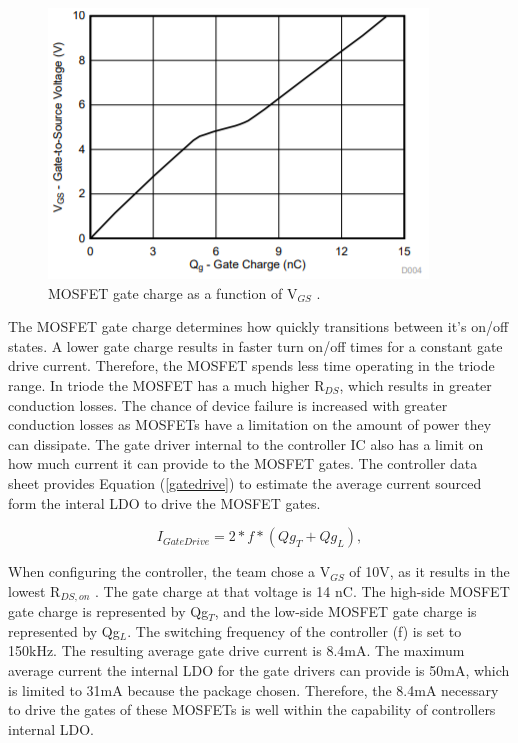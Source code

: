 \documentclass[11pt]{article}
\begin{document}
    \begin{figure}[H]
            \centering
            \includegraphics[width=0.5\linewidth]{mosfetgatecharge.PNG}
            \caption{MOSFET gate charge as a function of V$_{GS}$ \cite{shen_yaur_chen_block_2016}.}
            \label{mosfetgate}
    \end{figure}
    
    The MOSFET gate charge determines how quickly transitions between it's on/off states. A lower gate charge results in faster turn on/off times for a constant gate drive current. Therefore, the MOSFET spends less time operating in the triode range. In triode the MOSFET has a much higher R$_{DS}$, which results in greater conduction losses. The chance of device failure is increased with greater conduction losses as MOSFETs have a limitation on the amount of power they can dissipate.
    \newline
    \newline
    \noindent The gate driver internal to the controller IC also has a limit on how much current it can provide to the MOSFET gates. The controller data sheet provides Equation (\ref{gatedrive}) to estimate the average current sourced form the interal LDO to drive the MOSFET gates. 
    
    \begin{equation}
        I_{GateDrive}=2*f*(Qg_T+Qg_L),
        \label{gatedrive}
    \end{equation}
    
    \noindent When configuring the controller, the team chose a V$_{GS}$ of 10V, as it results in the lowest R$_{DS,on}$ \cite{shen_yaur_chen_block_2016}. The gate charge at that voltage is 14 nC. The high-side MOSFET gate charge is represented by Qg$_T$, and the low-side MOSFET gate charge is represented by Qg$_L$. The switching frequency of the controller (f) is set to 150kHz. The resulting average gate drive current is 8.4mA. The maximum average current the internal LDO for the gate drivers can provide is 50mA, which is limited to 31mA because the package chosen. Therefore, the 8.4mA necessary to drive the gates of these MOSFETs is well within the capability of controllers internal LDO.
    
\end{document}
